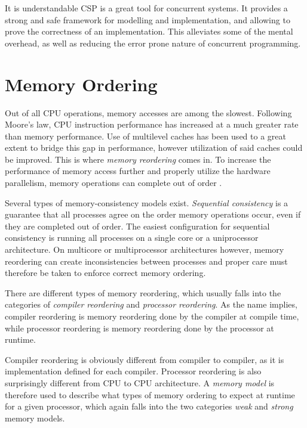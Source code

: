 It is understandable CSP is a great tool for concurrent systems. It provides a strong and safe framework for modelling and implementation, and allowing to prove the correctness of an implementation. This alleviates some of the mental overhead, as well as reducing the error prone nature of concurrent programming.


\section{Memory Ordering}
\label{sec:memory_ordering}


Out of all CPU operations, memory accesses are among the slowest. Following Moore's law, CPU instruction performance has increased at a much greater rate than memory performance. Use of multilevel caches has been used to a great extent to bridge this gap in performance, however utilization of said caches could be improved. This is where \textit{memory reordering} comes in. To increase the performance of memory access further and properly utilize the hardware parallelism, memory operations can complete out of order \citep{mckenney2007memory}.

Several types of memory\hyp{}consistency models exist. \textit{Sequential consistency} is a guarantee that all processes agree on the order memory operations occur, even if they are completed out of order. The easiest configuration for sequential consistency is running all processes on a single core or a uniprocessor architecture. On multicore or multiprocessor architectures however, memory reordering can create inconsistencies between processes and proper care must therefore be taken to enforce correct memory ordering. 

There are different types of memory reordering, which usually falls into the categories of \textit{compiler reordering} and \textit{processor reordering}. As the name implies, compiler reordering is memory reordering done by the compiler at compile time, while processor reordering is memory reordering done by the processor at runtime.

Compiler reordering is obviously different from compiler to compiler, as it is implementation defined for each compiler. Processor reordering is also surprisingly different from CPU to CPU architecture. A \textit{memory model} is therefore used to describe what types of memory ordering to expect at runtime for a given processor, which again falls into the two categories \textit{weak} and \textit{strong} memory models.

